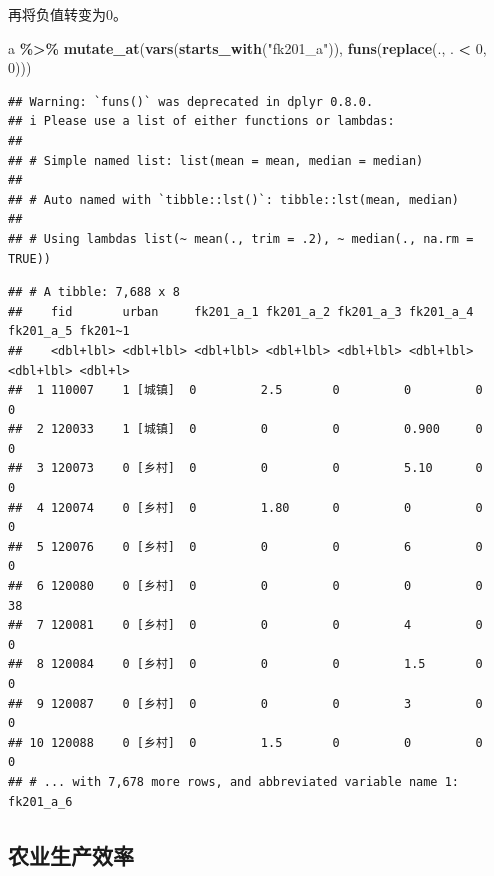 \documentclass[
  oneside]{book}
\newenvironment{Shaded}{\begin{snugshade}}{\end{snugshade}}
\newcommand{\DecValTok}[1]{\textcolor[rgb]{0.00,0.00,0.81}{#1}}
\newcommand{\FunctionTok}[1]{\textcolor[rgb]{0.13,0.29,0.53}{\textbf{#1}}}
\newcommand{\NormalTok}[1]{#1}
\newcommand{\SpecialCharTok}[1]{\textcolor[rgb]{0.81,0.36,0.00}{\textbf{#1}}}
\newcommand{\StringTok}[1]{\textcolor[rgb]{0.31,0.60,0.02}{#1}}
\begin{document}
再将负值转变为0。

\begin{Shaded}
\begin{Highlighting}[]
\NormalTok{a }\SpecialCharTok{\%\textgreater{}\%} \FunctionTok{mutate\_at}\NormalTok{(}\FunctionTok{vars}\NormalTok{(}\FunctionTok{starts\_with}\NormalTok{(}\StringTok{"fk201\_a"}\NormalTok{)), }\FunctionTok{funs}\NormalTok{(}\FunctionTok{replace}\NormalTok{(., . }\SpecialCharTok{\textless{}} \DecValTok{0}\NormalTok{, }\DecValTok{0}\NormalTok{)))}
\end{Highlighting}
\end{Shaded}

\begin{verbatim}
## Warning: `funs()` was deprecated in dplyr 0.8.0.
## i Please use a list of either functions or lambdas:
## 
## # Simple named list: list(mean = mean, median = median)
## 
## # Auto named with `tibble::lst()`: tibble::lst(mean, median)
## 
## # Using lambdas list(~ mean(., trim = .2), ~ median(., na.rm = TRUE))
\end{verbatim}

\begin{verbatim}
## # A tibble: 7,688 x 8
##    fid       urban     fk201_a_1 fk201_a_2 fk201_a_3 fk201_a_4 fk201_a_5 fk201~1
##    <dbl+lbl> <dbl+lbl> <dbl+lbl> <dbl+lbl> <dbl+lbl> <dbl+lbl> <dbl+lbl> <dbl+l>
##  1 110007    1 [城镇]  0         2.5       0         0         0          0     
##  2 120033    1 [城镇]  0         0         0         0.900     0          0     
##  3 120073    0 [乡村]  0         0         0         5.10      0          0     
##  4 120074    0 [乡村]  0         1.80      0         0         0          0     
##  5 120076    0 [乡村]  0         0         0         6         0          0     
##  6 120080    0 [乡村]  0         0         0         0         0         38     
##  7 120081    0 [乡村]  0         0         0         4         0          0     
##  8 120084    0 [乡村]  0         0         0         1.5       0          0     
##  9 120087    0 [乡村]  0         0         0         3         0          0     
## 10 120088    0 [乡村]  0         1.5       0         0         0          0     
## # ... with 7,678 more rows, and abbreviated variable name 1: fk201_a_6
\end{verbatim}

\hypertarget{ux519cux4e1aux751fux4ea7ux6548ux7387}{%
\subsection{农业生产效率}\label{ux519cux4e1aux751fux4ea7ux6548ux7387}}
\end{document}
